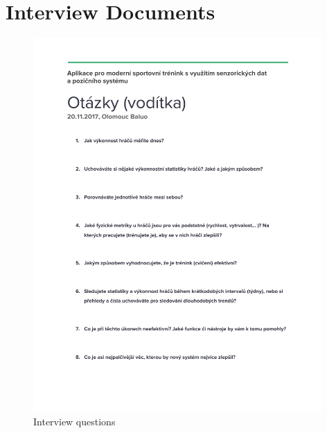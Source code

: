 \chapter{Interview Documents}
\begin{figure}[htb]
\begin{center}
  \includegraphics*[width=11cm,keepaspectratio]{images/questions}
\end{center}
\caption{Interview questions}
\label{img:questions}
\end{figure}

